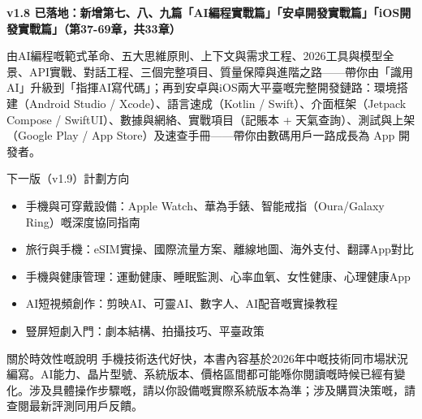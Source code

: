 

\textbf{v1.8 已落地：新增第七、八、九篇「AI編程實戰篇」「安卓開發實戰篇」「iOS開發實戰篇」（第37-69章，共33章）}\par

由AI編程嘅範式革命、五大思維原則、上下文與需求工程、2026工具與模型全景、API實戰、對話工程、三個完整項目、質量保障與進階之路——帶你由「識用AI」升級到「指揮AI寫代碼」；再到安卓與iOS兩大平臺嘅完整開發鏈路：環境搭建（Android Studio / Xcode）、語言速成（Kotlin / Swift）、介面框架（Jetpack Compose / SwiftUI）、數據與網絡、實戰項目（記賬本 + 天氣查詢）、測試與上架（Google Play / App Store）及速查手冊——帶你由數碼用戶一路成長為 App 開發者。

\begin{tcbinfo}{下一版（v1.9）計劃方向}
\begin{itemize}
  \item 手機與可穿戴設備：Apple Watch、華為手錶、智能戒指（Oura/Galaxy Ring）嘅深度協同指南
  \item 旅行與手機：eSIM實操、國際流量方案、離線地圖、海外支付、翻譯App對比
  \item 手機與健康管理：運動健康、睡眠監測、心率血氧、女性健康、心理健康App
  \item AI短視頻創作：剪映AI、可靈AI、數字人、AI配音嘅實操教程
  \item 豎屏短劇入門：劇本結構、拍攝技巧、平臺政策
\end{itemize}

\end{tcbinfo}

\begin{tcbwarn}{關於時效性嘅說明}
手機技術迭代好快，本書內容基於2026年中嘅技術同市場狀況編寫。AI能力、晶片型號、系統版本、價格區間都可能喺你閱讀嘅時候已經有變化。涉及具體操作步驟嘅，請以你設備嘅實際系統版本為準；涉及購買決策嘅，請查閱最新評測同用戶反饋。

\end{tcbwarn}
